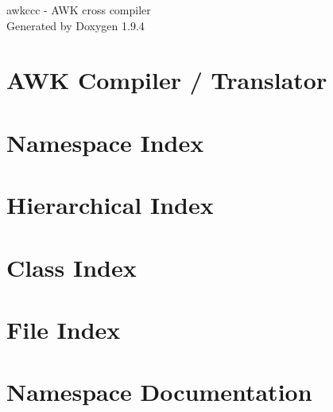 \documentclass[twoside]{book}
\newcommand{\+}{\discretionary{\mbox{\scriptsize$\hookleftarrow$}}{}{}}
\newcommand{\clearemptydoublepage}{%
    \newpage{\pagestyle{empty}\cleardoublepage}%
  }
\begin{document}
  \raggedbottom
    \hypersetup{pageanchor=false,
                bookmarksnumbered=true,
                pdfencoding=unicode
               }
  \begin{titlepage}
  \vspace*{7cm}
  \begin{center}%
  {\Large awkccc -\/ AWK cross compiler}\\
  \vspace*{1cm}
  {\large Generated by Doxygen 1.9.4}\\
  \end{center}
  \end{titlepage}
  \clearemptydoublepage
  \tableofcontents
  \clearemptydoublepage
  \hypersetup{pageanchor=true}
\chapter{AWK Compiler / Translator}
\label{index}\hypertarget{index}{}
\chapter{Namespace Index}

\chapter{Hierarchical Index}

\chapter{Class Index}

\chapter{File Index}

\chapter{Namespace Documentation}





\end{document}
